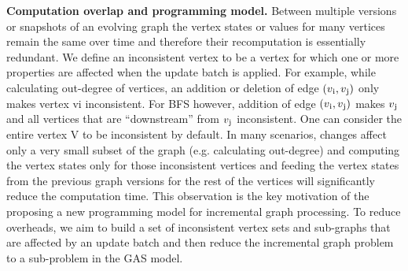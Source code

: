 {\bf Computation overlap and programming model.}
Between multiple versions or snapshots of an evolving graph the vertex states or values for many vertices remain the same over time and therefore their recomputation is essentially redundant. We define an inconsistent vertex to be a vertex for which one or more properties are affected when the update batch is applied. For example, while calculating out-degree of vertices, an addition or deletion of edge $(v\textsubscript{i},v\textsubscript{j})$ only makes vertex vi inconsistent. For BFS however, addition of edge $(v\textsubscript{i},v\textsubscript{j})$ makes $v\textsubscript{j}$ and all vertices that are “downstream” from $v\textsubscript{j}$ inconsistent. One can consider the entire vertex V to be inconsistent by default. In many scenarios, changes affect only a very small subset of the graph (e.g. calculating out-degree) and computing the vertex states only for those inconsistent vertices and feeding the vertex states from the previous graph versions for the rest of the vertices will significantly reduce the computation time. This observation is the key motivation of the proposing a new programming model for incremental graph processing. To reduce overheads, we aim to build a set of inconsistent vertex sets and sub-graphs that are affected by an update batch and then reduce the incremental graph problem to a sub-problem in the GAS model.

